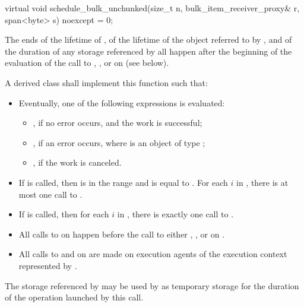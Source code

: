 %
\begin{itemdecl}
virtual void schedule_bulk_unchunked(size_t n, bulk_item_receiver_proxy& r,
                                     span<byte> s) noexcept = 0;
\end{itemdecl}

\begin{itemdescr}
\pnum
\expects
The ends
of the lifetime of ,
of the lifetime of the object referred to by , and
of the duration of any storage referenced by 
all happen after
the beginning of the evaluation of the call to
, , or 
on  (see below).

\pnum
\effects
A derived class shall implement this function such that:
\begin{itemize}
\item
Eventually, one of the following expressions is evaluated:
\begin{itemize}
\item
{}, if no error occurs, and the work is successful;
\item
{}, if an error occurs,
where  is an object of type ;
\item
{}, if the work is canceled.
\end{itemize}
\item
If  is called,
then  is in the range  and
 is equal to .
For each $i$ in ,
there is at most one call to .
\item
If  is called,
then for each $i$ in ,
there is exactly one call to .
\item
All calls to  on  happen before
the call to either , , or 
on .
\item
All calls to  and  on  are made
on execution agents of the execution context represented by .
\end{itemize}

\pnum
\remarks
The storage referenced by  may be used by 
as temporary storage for the duration of the operation launched by this call.
\end{itemdescr}
